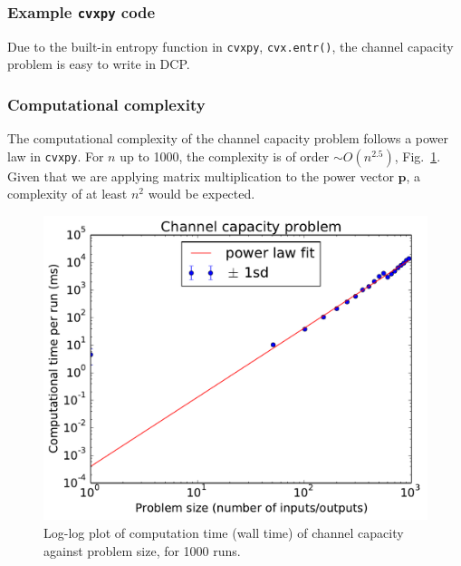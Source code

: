 \documentclass[twocolumn,secnumarabic,amssymb, nobibnotes, aps, prl,superscriptaddress]{revtex4-1}
\begin{document}
\subsubsection{Example \texttt{cvxpy} code}
Due to the built-in entropy function in \texttt{cvxpy}, \texttt{cvx.entr()}, the channel capacity problem is easy to write in DCP.



\subsubsection{Computational complexity}
The computational complexity of the channel capacity problem follows a power law in \texttt{cvxpy}.  For $n$ up to 1000, the complexity is of order $\sim O(n^{2.5})$, Fig.~\ref{fig:channel_capacity_complexity}. Given that we are applying matrix multiplication to the power vector $\textbf{p}$, a complexity of at least $n^2$ would be expected.
\begin{figure}
\includegraphics[width=0.9\linewidth]{channel_capacity_complexity.pdf}
\caption{\label{fig:channel_capacity_complexity}Log-log plot of computation time (wall time) of channel capacity against problem size, for 1000 runs.}
\end{figure}
\end{document}
